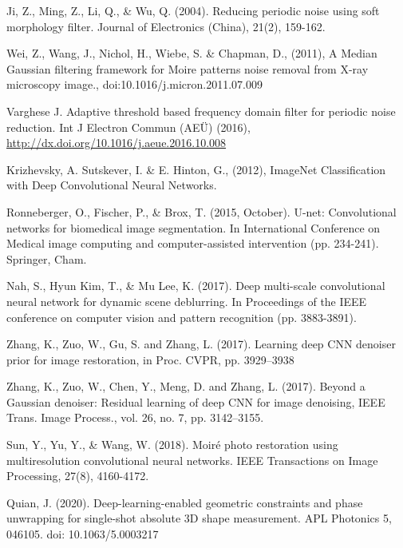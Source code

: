\documentclass[10pt,letterpaper]{article}
\begin{document}
\begin{thebibliography}{0}

Ji, Z., Ming, Z., Li, Q., \& Wu, Q. (2004). Reducing periodic noise using soft morphology filter. Journal of Electronics (China), 21(2), 159-162.

Wei, Z., Wang, J., Nichol, H., Wiebe, S. \& Chapman, D., (2011), A Median Gaussian filtering framework for Moire patterns noise removal from X-ray microscopy image., doi:10.1016/j.micron.2011.07.009

Varghese J. Adaptive threshold based frequency domain filter for periodic noise reduction. Int J Electron Commun (AEÜ) (2016), \url{http://dx.doi.org/10.1016/j.aeue.2016.10.008}

Krizhevsky, A. Sutskever, I. \& E. Hinton, G., (2012), ImageNet Classification with Deep Convolutional Neural Networks.

Ronneberger, O., Fischer, P., \& Brox, T. (2015, October). U-net: Convolutional networks for biomedical image segmentation. In International Conference on Medical image computing and computer-assisted intervention (pp. 234-241). Springer, Cham.

Nah, S., Hyun Kim, T., \& Mu Lee, K. (2017). Deep multi-scale convolutional neural network for dynamic scene deblurring. In Proceedings of the IEEE conference on computer vision and pattern recognition (pp. 3883-3891).

Zhang, K., Zuo, W., Gu, S. and  Zhang, L. (2017). Learning deep CNN denoiser prior for image restoration, in Proc. CVPR, pp. 3929–3938
    
Zhang, K., Zuo, W., Chen, Y., Meng, D. and Zhang, L. (2017). Beyond a Gaussian denoiser: Residual learning of deep CNN for image denoising, IEEE Trans. Image Process., vol. 26, no. 7, pp. 3142–3155.

Sun, Y., Yu, Y., \& Wang, W. (2018). Moiré photo restoration using multiresolution convolutional neural networks. IEEE Transactions on Image Processing, 27(8), 4160-4172.

Quian, J. (2020). Deep-learning-enabled geometric constraints and phase unwrapping for single-shot absolute 3D shape measurement.  APL Photonics 5, 046105. doi: 10.1063/5.0003217

\end{thebibliography}

%
\end{document}
